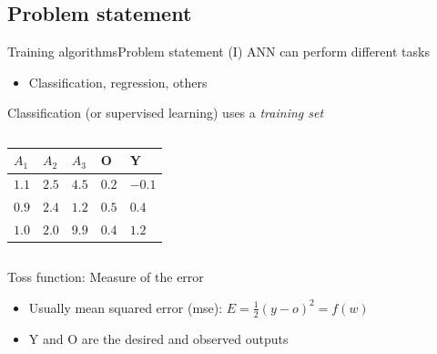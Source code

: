 \documentclass[10pt,compress]{beamer} %
\begin{document}
\subsection{Problem statement}

\begin{frame}{Training algorithms}{Problem statement (I)}
	ANN can perform different tasks
    \begin{itemize}
        \item Classification, regression, others
    \end{itemize}
    Classification (or supervised learning) uses a \textit{training set}

    \begin{columns}
            

            \begin{table}[]
            \centering
            \begin{tabular}{lll|l|l}\hline
              $A_1$ & $A_2$ & $A_3$ & O & Y \\
               \hline
              $1.1$ & $2.5$ & $4.5$ & $0.2$ & $-0.1$   \\
              $0.9$ & $2.4$ & $1.2$ & $0.5$ & $0.4$  \\
              $1.0$ & $2.0$ & $9.9$ & $0.4$ & $1.2$ \\\hline
            \end{tabular}
            \end{table}
    \end{columns}
    Toss function: Measure of the error
        \begin{itemize}
		\item Usually mean squared error (mse): $E = \frac{1}{2} (y-o)^2 = f(w)$
        \item Y and O are the desired and observed outputs
        \end{itemize}
\end{frame}
\end{document}
